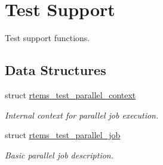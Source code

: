\hypertarget{group__RTEMSTest}{}\section{Test Support}
\label{group__RTEMSTest}


Test support functions.  


\subsection*{Data Structures}
\begin{DoxyCompactItemize}
\item 
struct \mbox{\hyperlink{structrtems__test__parallel__context}{rtems\+\_\+test\+\_\+parallel\+\_\+context}}
\begin{DoxyCompactList}\small\item\em Internal context for parallel job execution. \end{DoxyCompactList}\item 
struct \mbox{\hyperlink{structrtems__test__parallel__job}{rtems\+\_\+test\+\_\+parallel\+\_\+job}}
\begin{DoxyCompactList}\small\item\em Basic parallel job description. \end{DoxyCompactList}\end{DoxyCompactItemize}
